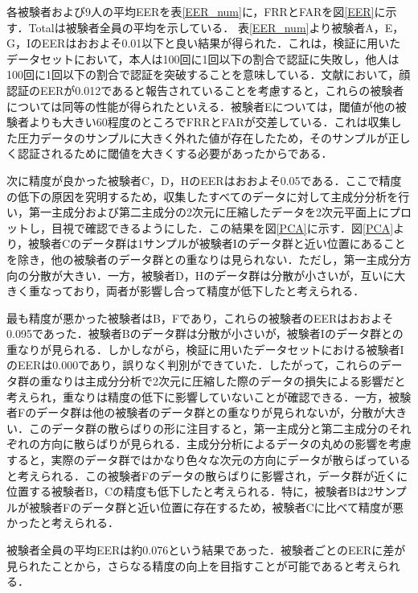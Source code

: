 \documentclass[Japanese,noauthor]{dicomopapers}
\begin{document}
各被験者および9人の平均EERを表\ref{EER_num}に，FRRとFARを図\ref{EER}に示す．Totalは被験者全員の平均を示している．
表\ref{EER_num}より被験者A，E，G，IのEERはおおよそ0.01以下と良い結果が得られた．これは，検証に用いたデータセットにおいて，本人は100回に1回以下の割合で認証に失敗し，他人は100回に1回以下の割合で認証を突破することを意味している．文献\cite{face_auth}において，顔認証のEERが0.012であると報告されていることを考慮すると，これらの被験者については同等の性能が得られたといえる．被験者Eについては，閾値が他の被験者よりも大きい60程度のところでFRRとFARが交差している．これは収集した圧力データのサンプルに大きく外れた値が存在したため，そのサンプルが正しく認証されるために閾値を大きくする必要があったからである．\par

次に精度が良かった被験者C，D，HのEERはおおよそ0.05である．ここで精度の低下の原因を究明するため，収集したすべてのデータに対して主成分分析を行い，第一主成分および第二主成分の2次元に圧縮したデータを2次元平面上にプロットし，目視で確認できるようにした．この結果を図\ref{PCA}に示す．図\ref{PCA}より，被験者Cのデータ群は1サンプルが被験者Iのデータ群と近い位置にあることを除き，他の被験者のデータ群との重なりは見られない．ただし，第一主成分方向の分散が大きい．一方，被験者D，Hのデータ群は分散が小さいが，互いに大きく重なっており，両者が影響し合って精度が低下したと考えられる．\par

最も精度が悪かった被験者はB，Fであり，これらの被験者のEERはおおよそ0.095であった．被験者Bのデータ群は分散が小さいが，被験者Iのデータ群との重なりが見られる．しかしながら，検証に用いたデータセットにおける被験者IのEERは0.000であり，誤りなく判別ができていた．したがって，これらのデータ群の重なりは主成分分析で2次元に圧縮した際のデータの損失による影響だと考えられ，重なりは精度の低下に影響していないことが確認できる．一方，被験者Fのデータ群は他の被験者のデータ群との重なりが見られないが，分散が大きい．このデータ群の散らばりの形に注目すると，第一主成分と第二主成分のそれぞれの方向に散らばりが見られる．主成分分析によるデータの丸めの影響を考慮すると，実際のデータ群ではかなり色々な次元の方向にデータが散らばっていると考えられる．この被験者Fのデータの散らばりに影響され，データ群が近くに位置する被験者B，Cの精度も低下したと考えられる．特に，被験者Bは2サンプルが被験者Fのデータ群と近い位置に存在するため，被験者Cに比べて精度が悪かったと考えられる．\par

被験者全員の平均EERは約0.076という結果であった．被験者ごとのEERに差が見られたことから，さらなる精度の向上を目指すことが可能であると考えられる．\par
\end{document}
